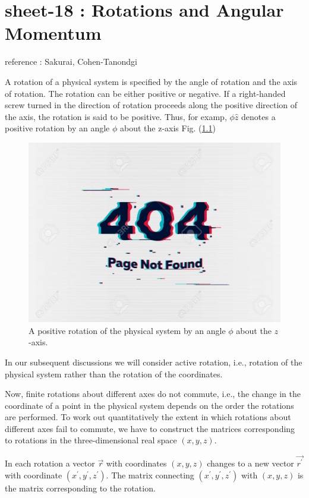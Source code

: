 
\chapter{sheet-18 : Rotations and Angular Momentum}

\ifpdf
\graphicspath{{Chapter18/figs/}}
\else
\graphicspath{{Chapter18/figs/}}
\fi

reference : Sakurai, Cohen-Tanondgi\newline

A rotation of a physical system is specified by the angle of rotation and the axis of rotation. The rotation can be either positive or negative. If a right-handed screw turned in the direction of rotation proceeds along the positive direction of the axis, the rotation is said to be positive. Thus, for examp, $\phi\hat{z}$ denotes a positive rotation by an angle $\phi$ about the z-axis Fig. (\ref{chapter18.fig1})

\begin{figure}
	\centering
	\includegraphics[width=0.5\linewidth]{Pictures/not-found.jpg}
	\caption{A positive rotation of the physical system by an angle $\phi$ about the $z$-axis.}
	\label{chapter18.fig1}
\end{figure}
In our subsequent discussions we will consider active rotation, i.e., rotation of the physical system rather than the rotation of the coordinates.


Now, finite rotations about different axes do not commute, i.e., the change in the coordinate of a point in the physical system depends on the order the rotations are performed. To work out quantitatively the extent in which rotations about different axes fail to commute, we have to construct the matrices corresponding to rotations in the three-dimensional real space $(x,y,z)$.


In each rotation a vector $\vec{r}$ with coordinates $(x, y, z)$ changes to a new vector $\vec{r^\prime}$ with coordinate $(x^\prime,y^\prime,z^\prime)$. The matrix connecting $(x^\prime,y^\prime,z^\prime)$ with $(x,y,z)$ is the matrix corresponding to the rotation.

